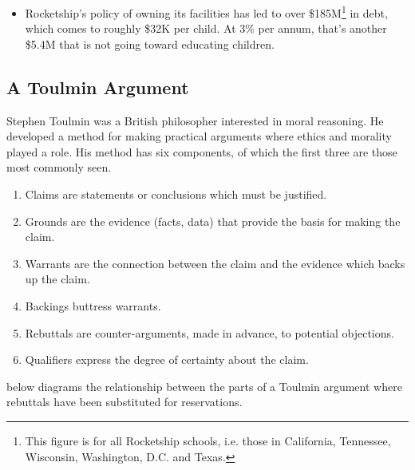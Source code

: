 \begin{enumerate}[topsep=0.3\baselineskip,itemsep=0.25\baselineskip]
\begin{itemize}[topsep=0.125\baselineskip,itemsep=0.25\baselineskip]
      \item Rocketship's policy of owning its facilities has led to over \$185M\footnote{This figure is for all Rocketship schools, i.e. those in  California, Tennessee, Wisconsin, Washington, D.C. and Texas.} in debt, which comes to roughly \$32K per child. At 3\% per annum, that's another \$5.4M that is not going toward educating children.
    \end{itemize}
\end{enumerate}

\subsection{A Toulmin Argument}%
\label{sec:toulmin-arguments}\indent%

Stephen Toulmin was a British philosopher interested in moral reasoning. He developed a method for making practical arguments where ethics and morality played a role. His method has six components, of which the first three are those most commonly seen.
\begin{enumerate}[topsep=0.3\baselineskip,itemsep=0.25\baselineskip]
  \item Claims are statements or conclusions which must be justified.
  \item Grounds are the evidence (facts, data) that provide the basis for making the claim.
  \item Warrants are the connection between the claim and the evidence which backs up the claim.
  \item Backings buttress warrants.
  \item Rebuttals are counter-arguments, made in advance, to potential objections.
  \item Qualifiers express the degree of certainty about the claim.
\end{enumerate}

 below diagrams the relationship between the parts of a Toulmin argument where rebuttals have been substituted for reservations.

